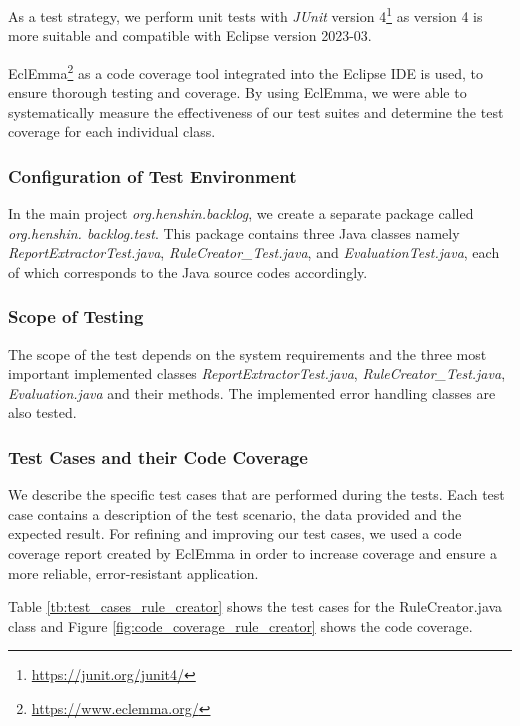 As a test strategy, we perform unit tests with \textit{JUnit} version 4\footnote{\href{https://junit.org/junit4/}{https://junit.org/junit4/}} as version 4 is more suitable and compatible with Eclipse version 2023-03.

EclEmma\footnote{\href{https://www.eclemma.org/}{https://www.eclemma.org/}} as a code coverage tool integrated into the Eclipse IDE is used, to ensure thorough testing and coverage. By using EclEmma, we were able to systematically measure the effectiveness of our test suites and determine the test coverage for each individual class.
\subsubsection*{Configuration of Test Environment}
In the main project \textit{org.henshin.backlog}, we create a separate package called \textit{org.henshin. backlog.test}. This package contains three Java classes namely \textit{ReportExtractorTest.java}, \textit{RuleCreator\_Test.java}, and \textit{EvaluationTest.java}, each of which corresponds to the Java source codes accordingly.
\subsubsection*{Scope of Testing}
The scope of the test depends on the system requirements and the three most important implemented classes \textit{ReportExtractorTest.java}, \textit{RuleCreator\_Test.java}, \textit{Evaluation.java} and their methods. The implemented error handling classes are also tested.
\subsubsection*{Test Cases and their Code Coverage}
We describe the specific test cases that are performed during the tests. Each test case contains a description of the test scenario, the data provided and the expected result. For refining and improving our test cases, we used a code coverage report created by EclEmma in order to increase coverage and ensure a more reliable, error-resistant application.

Table \ref{tb:test_cases_rule_creator} shows the test cases for the RuleCreator.java class and Figure \ref{fig:code_coverage_rule_creator} shows the code coverage.

